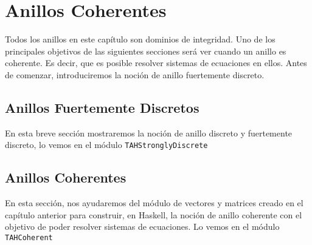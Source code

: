 \chapter{Anillos Coherentes}\label{sec:coherentHas}
Todos los anillos en este capítulo son dominios de integridad. Uno de los principales objetivos de las siguientes secciones será ver cuando un anillo es coherente. Es decir, que es posible resolver sistemas de ecuaciones en ellos. Antes de comenzar, introduciremos la noción de anillo fuertemente discreto.
\section{Anillos Fuertemente Discretos}
En esta breve sección mostraremos la noción de anillo discreto y fuertemente discreto, lo vemos en el módulo \texttt{TAHStronglyDiscrete} 

\section{Anillos Coherentes}
En esta sección, nos ayudaremos del módulo de vectores y matrices creado en el capítulo anterior para construir, en Haskell, la noción de anillo coherente con el objetivo de poder resolver sistemas de ecuaciones. Lo vemos en el módulo \texttt{TAHCoherent} 

